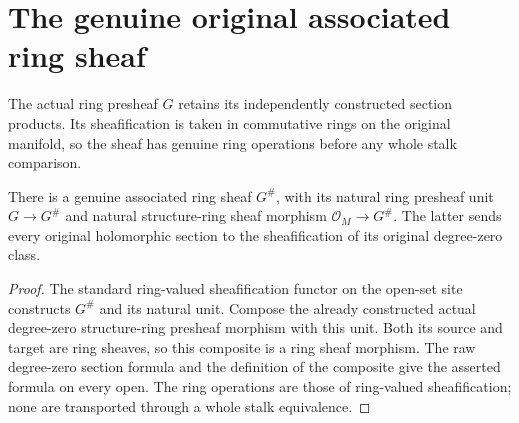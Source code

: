 \section{The genuine original associated ring sheaf}

The actual ring presheaf $G$ retains its independently constructed section
products. Its sheafification is taken in commutative rings on the original
manifold, so the sheaf has genuine ring operations before any whole stalk
comparison.

\begin{definition}
\label{hir:real-domain-actual-normal-associated-ring-sheaf}
\leanok
There is a genuine associated ring sheaf $G^{\#}$, with its natural ring
presheaf unit $G\to G^{\#}$ and natural structure-ring sheaf morphism
$\mathcal O_M\to G^{\#}$. The latter sends every original holomorphic
section to the sheafification of its original degree-zero class.
\end{definition}
\begin{proof}
The standard ring-valued sheafification functor on the open-set site
constructs $G^{\#}$ and its natural unit. Compose the already constructed
actual degree-zero structure-ring presheaf morphism with this unit.
Both its source and target are ring sheaves, so this composite is a
ring sheaf morphism. The raw degree-zero section formula and the
definition of the composite give the asserted formula on every open.
The ring operations are those of ring-valued sheafification; none are
transported through a whole stalk equivalence.
\end{proof}

